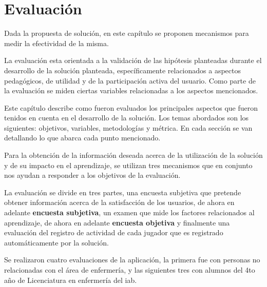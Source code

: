 \chapter{Evaluación}

Dada la propuesta de solución, en este capítulo se proponen mecanismos para medir la
efectividad de la misma.

La evaluación esta orientada a la validación de las hipótesis planteadas durante
el desarrollo de la solución planteada, específicamente relacionados a aspectos
pedagógicos, de utilidad y de la participación activa del usuario. Como parte de la 
evaluación se miden ciertas variables relacionadas a los aspectos mencionados.

Este capítulo describe como fueron evaluados los principales aspectos que fueron
tenidos en cuenta en el desarrollo de la solución. Los temas abordados son los siguientes:
objetivos, variables, metodologías y métrica. En cada sección se van detallando
lo que abarca cada punto mencionado.


Para la obtención de la información deseada acerca de la utilización de la
solución y de su impacto en el aprendizaje, se utilizan tres mecanismos que en
conjunto nos ayudan a responder a los objetivos de la evaluación.

La evaluación se divide en tres partes, una encuesta subjetiva que pretende
obtener información acerca de la satisfacción de los usuarios, de ahora en
adelante \textbf{encuesta subjetiva}, un examen que mide los factores
relacionados al aprendizaje, de ahora en adelante \textbf{encuesta objetiva}  y
finalmente una evaluación del registro de actividad de cada jugador que es
registrado automáticamente por la solución.


Se realizaron cuatro evaluaciones de la aplicación, la primera fue con personas
no relacionadas con el área de enfermería, y las siguientes tres con alumnos del
4to año de Licenciatura en enfermería del \Gls{iab}.








